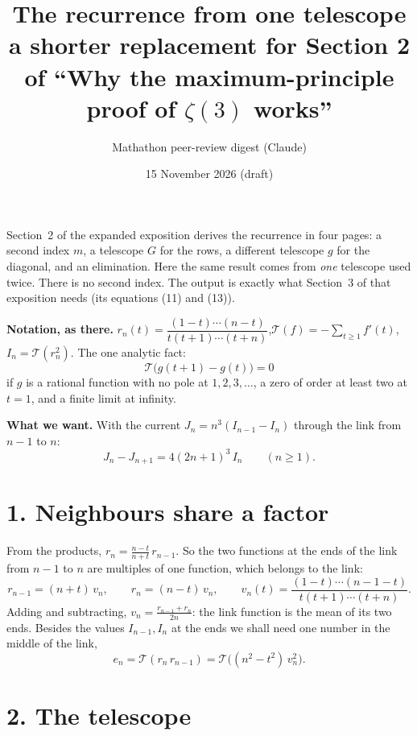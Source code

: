 \documentclass[11pt]{article}
\title{The recurrence from one telescope\\[2pt]
\large a shorter replacement for Section 2 of ``Why the maximum-principle proof of $\zeta(3)$ works''}
\author{Mathathon peer-review digest (Claude)}
\date{15 November 2026 \quad(draft)}
\newcommand{\T}{\mathcal T}
\newcommand{\q}[1]{\medskip\noindent\textbf{#1}}
\begin{document}
\maketitle

\noindent Section~2 of the expanded exposition derives the recurrence in four pages: a second index
$m$, a telescope $G$ for the rows, a different telescope $g$ for the diagonal, and an elimination.
Here the same result comes from \emph{one} telescope used twice. There is no second index. The
output is exactly what Section~3 of that exposition needs (its equations (11) and (13)).

\q{Notation, as there.}
$r_n(t)=\dfrac{(1-t)\cdots(n-t)}{t(t+1)\cdots(t+n)}$,\quad $\T(f)=-\sum_{t\ge1}f'(t)$,\quad
$I_n=\T(r_n^2)$. The one analytic fact:
\begin{equation}\label{tel}
\T\bigl(g(t+1)-g(t)\bigr)=0
\end{equation}
if $g$ is a rational function with no pole at $1,2,3,\dots$, a zero of order at least two at
$t=1$, and a finite limit at infinity.

\q{What we want.} With the current $J_n=n^3(I_{n-1}-I_n)$ through the link from $n-1$ to $n$:
\begin{equation}\label{K}
J_n-J_{n+1}=4(2n+1)^3\,I_n\qquad(n\ge1).
\end{equation}

\section*{1. Neighbours share a factor}

From the products, $r_n=\frac{n-t}{n+t}\,r_{n-1}$. So the two functions at the ends of the link
from $n-1$ to $n$ are multiples of one function, which belongs to the link:
\[
r_{n-1}=(n+t)\,v_n,\qquad r_n=(n-t)\,v_n,\qquad
v_n(t)=\frac{(1-t)\cdots(n-1-t)}{t(t+1)\cdots(t+n)} .
\]
Adding and subtracting, $v_n=\frac{r_{n-1}+r_n}{2n}$: the link function is the mean of its two ends.
Besides the values $I_{n-1},I_n$ at the ends we shall need one number in the middle of the link,
\[
e_n=\T(r_n\,r_{n-1})=\T\bigl((n^2-t^2)\,v_n^2\bigr).
\]

\section*{2. The telescope}
\end{document}
